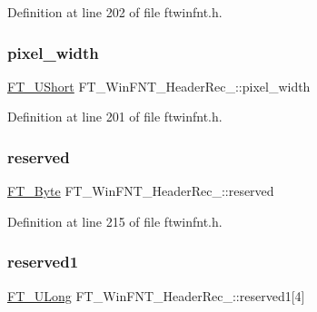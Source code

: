 Definition at line 202 of file ftwinfnt.\+h.

\mbox{\label{struct_f_t___win_f_n_t___header_rec___aee6e993e5530933e2c6d99446ed7fc7c}} 
\subsubsection{\texorpdfstring{pixel\_width}{pixel\_width}}
{\footnotesize\ttfamily \mbox{\hyperlink{fttypes_8h_a937f6c17cf5ffd09086d8610c37b9f58}{F\+T\+\_\+\+U\+Short}} F\+T\+\_\+\+Win\+F\+N\+T\+\_\+\+Header\+Rec\+\_\+\+::pixel\+\_\+width}



Definition at line 201 of file ftwinfnt.\+h.

\mbox{\label{struct_f_t___win_f_n_t___header_rec___a802cb51af97c1f9c556d1db71e2ea51a}} 
\subsubsection{\texorpdfstring{reserved}{reserved}}
{\footnotesize\ttfamily \mbox{\hyperlink{fttypes_8h_a51f26183ca0c9f4af958939648caeccd}{F\+T\+\_\+\+Byte}} F\+T\+\_\+\+Win\+F\+N\+T\+\_\+\+Header\+Rec\+\_\+\+::reserved}



Definition at line 215 of file ftwinfnt.\+h.

\mbox{\label{struct_f_t___win_f_n_t___header_rec___af01de9742608fb7a2a603d062f3783e3}} 
\subsubsection{\texorpdfstring{reserved1}{reserved1}}
{\footnotesize\ttfamily \mbox{\hyperlink{fttypes_8h_a4fac88bdba78eb76b505efa6e4fbf3f5}{F\+T\+\_\+\+U\+Long}} F\+T\+\_\+\+Win\+F\+N\+T\+\_\+\+Header\+Rec\+\_\+\+::reserved1\mbox{[}4\mbox{]}}



